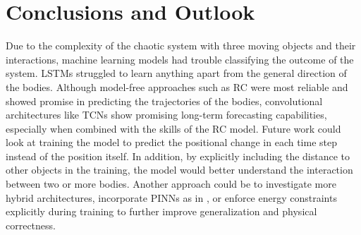 \documentclass[%
 reprint,
 amsmath,amssymb,
 aps,
]{revtex4-2}
\begin{document}

\section{\label{sec:conclusion}Conclusions and Outlook} %


Due to the complexity of the chaotic system with three moving objects and their interactions, machine learning models had trouble classifying the outcome of the system. LSTMs struggled to learn anything apart from the general direction of the bodies. Although model-free approaches such as RC were most reliable and showed promise in predicting the trajectories of the bodies, convolutional architectures like TCNs show promising long-term forecasting capabilities, especially when combined with the skills of the RC model. Future work could look at training the model to predict the positional change in each time step instead of the position itself. In addition, by explicitly including the distance to other objects in the training, the model would better understand the interaction between two or more bodies. Another approach could be to investigate more hybrid architectures, incorporate PINNs as in \cite{RAISSI2019686}, or enforce energy constraints explicitly during training to further improve generalization and physical correctness. 
\end{document}
